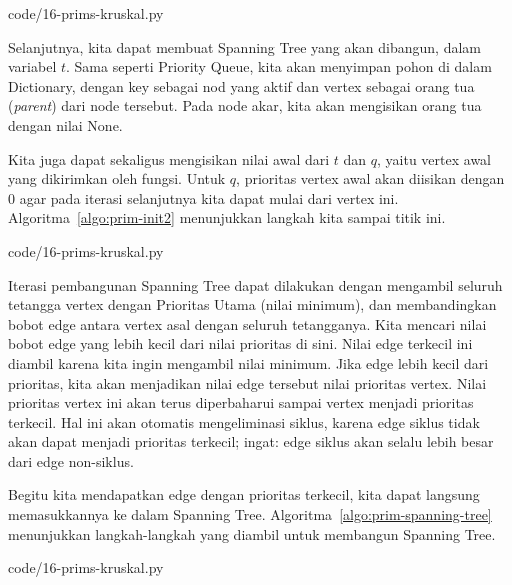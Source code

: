 
                {code/16-prims-kruskal.py}

Selanjutnya, kita dapat membuat Spanning Tree yang akan dibangun, dalam variabel $t$. Sama seperti Priority Queue, kita akan menyimpan pohon di dalam Dictionary, dengan key sebagai nod yang aktif dan vertex sebagai orang tua (\textit{parent}) dari node tersebut. Pada node akar, kita akan mengisikan orang tua dengan nilai None.

Kita juga dapat sekaligus mengisikan nilai awal dari $t$ dan $q$, yaitu vertex awal yang dikirimkan oleh fungsi. Untuk $q$, prioritas vertex awal akan diisikan dengan $0$ agar pada iterasi selanjutnya kita dapat mulai dari vertex ini. Algoritma~\ref{algo:prim-init2} menunjukkan langkah kita sampai titik ini.


                {code/16-prims-kruskal.py}

Iterasi pembangunan Spanning Tree dapat dilakukan dengan mengambil seluruh tetangga vertex dengan Prioritas Utama (nilai minimum), dan membandingkan bobot edge antara vertex asal dengan seluruh tetangganya. Kita mencari nilai bobot edge yang lebih kecil dari nilai prioritas di sini. Nilai edge terkecil ini diambil karena kita ingin mengambil nilai minimum. Jika edge lebih kecil dari prioritas, kita akan menjadikan nilai edge tersebut nilai prioritas vertex. Nilai prioritas vertex ini akan terus diperbaharui sampai vertex menjadi prioritas terkecil. Hal ini akan otomatis mengeliminasi siklus, karena edge siklus tidak akan dapat menjadi prioritas terkecil; ingat: edge siklus akan selalu lebih besar dari edge non-siklus.

Begitu kita mendapatkan edge dengan prioritas terkecil, kita dapat langsung memasukkannya ke dalam Spanning Tree. Algoritma~\ref{algo:prim-spanning-tree} menunjukkan langkah-langkah yang diambil untuk membangun Spanning Tree.


                {code/16-prims-kruskal.py}

